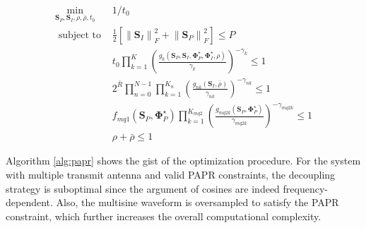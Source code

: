 \begin{eqnarray}
  {\mathop {\min }\limits_{{{\mathbf{S}}_P},{{\mathbf{S}}_I},\rho ,\bar \rho ,{t_0}} }&{1/{t_0}} \label{eqn:papr_target} \\
  {{\text{ subject to }}}&{\frac{1}{2}\left[ {\left\| {{{\mathbf{S}}_I}} \right\|_F^2 + \left\| {{{\mathbf{S}}_P}} \right\|_F^2} \right] \leqslant P} \label{eqn:papr_power_constraint} \\
  {}&{{t_0}\prod\limits_{k = 1}^K {{{\left( {\frac{{{g_k}\left( {{{\mathbf{S}}_P},{{\mathbf{S}}_I},{\mathbf{\Phi }}_P^ \star ,{\mathbf{\Phi }}_I^ \star ,\rho } \right)}}{{{\gamma _k}}}} \right)}^{ - {\gamma _k}}}}  \leqslant 1} \label{eqn:papr_current_constraint} \\
  {}&{{2^{\bar R}}\prod\limits_{n = 0}^{N - 1} {\prod\limits_{k = 1}^{{K_n}} {{{\left( {\frac{{{g_{nk}}\left( {{{\mathbf{S}}_I},\bar \rho } \right)}}{{{\gamma _{nk}}}}} \right)}^{ - {\gamma _{nk}}}}} }  \leqslant 1} \label{eqn:papr_rate_constraint} \\
  {}&{{f_{mq1}}\left( {{{\mathbf{S}}_P},{\mathbf{\Phi }}_P^ \star } \right)\prod\limits_{k = 1}^{{K_{mq2}}} {{{\left( {\frac{{{g_{mq2k}}\left( {{{\mathbf{S}}_P},{\mathbf{\Phi }}_P^ \star } \right)}}{{{\gamma _{mq2k}}}}} \right)}^{ - {\gamma _{mq2k}}}}}  \leqslant 1} \label{eqn:papr_papr_constraint} \\
  {}&{\rho  + \bar \rho  \leqslant 1} \label{eqn:papr_ratio_constraint}
\end{eqnarray}

Algorithm \ref{alg:papr} shows the gist of the optimization procedure. For the system with multiple transmit antenna and valid PAPR constraints, the decoupling strategy is suboptimal since the argument of cosines are indeed frequency-dependent. Also, the multisine waveform is oversampled to satisfy the PAPR constraint, which further increases the overall computational complexity.

